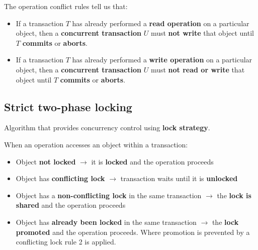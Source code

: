 The operation conflict rules tell us that:
\begin{itemize}
    \item If a transaction \(T\) has already performed a \textbf{read operation} on a particular object, then a \textbf{concurrent transaction} \(U\) must \textbf{not write} that object until \(T\) \textbf{commits} or \textbf{aborts}.
    \item If a transaction \(T\) has already performed a \textbf{write operation} on a particular object, then a \textbf{concurrent transaction} \(U\) must \textbf{not read or write} that object until \(T\) \textbf{commits} or \textbf{aborts}.
\end{itemize}

\subsection{Strict two-phase locking}
Algorithm that provides concurrency control using \textbf{lock strategy}. 

When an operation accesses an object within a transaction:
\begin{itemize}
    \item Object \textbf{not locked} \(\rightarrow\) it is \textbf{locked} and the operation proceeds
    \item Object has \textbf{conflicting lock} \(\rightarrow\) transaction waits until it is \textbf{unlocked}
    \item Object has a \textbf{non-conflicting lock} in the same transaction \(\rightarrow\) the \textbf{lock is shared} and the operation proceeds
    \item Object has \textbf{already been locked} in the same transaction \(\rightarrow\) the \textbf{lock promoted} and the operation proceeds. Where promotion is prevented by a conflicting lock rule 2 is applied. 
\end{itemize}

